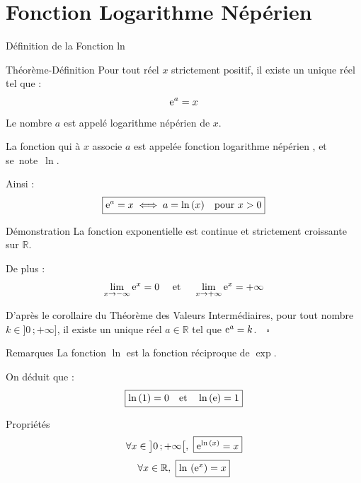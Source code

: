 \documentclass{coursbook}
\begin{document}
    \chapter{Fonction Logarithme Népérien}

    \begin{Gpartie}{Définition de la Fonction ln}
        \begin{Spartie}{Théorème-Définition}
            Pour tout réel $x$ strictement positif, il existe un unique réel tel que :
            \[\mathrm{e}^a=x\]
            Le nombre $a$ est appelé logarithme népérien de $x$.
            
            La fonction qui à $x$ associe $a$ est appelée \og fonction logarithme népérien \fg{}, et se~note~$\ln$.

            Ainsi :
            \[\boxed{\mathrm{e}^a=x\iff a=\ln\,(x)\quad\text{pour $x>0$}}\]
        \end{Spartie}
        \begin{Spartie}{Démonstration}
            La fonction exponentielle est continue et strictement croissante sur $\mathbb{R}$.

            De plus :
            \[\lim_{x\to -\infty} \mathrm{e}^x=0\quad\text{ et }\quad\lim_{x\to +\infty} \mathrm{e}^x=+\infty\]

            D'après le corollaire du Théorème des Valeurs Intermédiaires, pour tout nombre $k\in\big]0\,;+\infty\big]$, il existe un unique réel $a\in\mathbb{R}$ tel que $\mathrm{e}^a=k$.$\quad\square$
        \end{Spartie}
        \begin{Spartie}{Remarques}
            La fonction $\ln$ est la fonction réciproque de $\exp$.

            On déduit que : \[\boxed{\ln\,(1)=0\quad\text{et}\quad\ln\,(\mathrm{e})=1}\]
        \end{Spartie}
        \begin{Spartie}{Propriétés}
            \[\forall x\in\big]0\,;+\infty\big[,~\boxed{\mathrm{e}^{\ln\,(x)}=x}\]
            \[\forall x\in\mathbb{R},~\boxed{\ln\,\left(\mathrm{e}^x\right)=x}\]
        \end{Spartie}
    \end{Gpartie}
\end{document}
